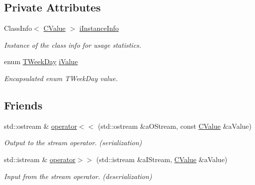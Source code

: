 \subsection*{Private Attributes}
\begin{DoxyCompactItemize}
\item 
Class\+Info$<$ \hyperlink{class_c_value___t_week_day_1_1_c_value}{C\+Value} $>$ \hyperlink{class_c_value___t_week_day_1_1_c_value_ad4482c30bcef137bae7669a2d7378cae}{i\+Instance\+Info}
\begin{DoxyCompactList}\small\item\em Instance of the class info for usage statistics. \end{DoxyCompactList}\item 
enum \hyperlink{namespace_c_value___t_week_day_a6412f204509f223b789fb5f1a61a6124}{T\+Week\+Day} \hyperlink{class_c_value___t_week_day_1_1_c_value_ad067d6e43b0204dc09f1177721891a75}{i\+Value}
\begin{DoxyCompactList}\small\item\em Encapsulated {\ttfamily enum} T\+Week\+Day value. \end{DoxyCompactList}\end{DoxyCompactItemize}
\subsection*{Friends}
\begin{DoxyCompactItemize}
\item 
std\+::ostream \& \hyperlink{class_c_value___t_week_day_1_1_c_value_a3d28097fae6bdd5a8146d9ab90f8b62f}{operator$<$$<$} (std\+::ostream \&a\+O\+Stream, const \hyperlink{class_c_value___t_week_day_1_1_c_value}{C\+Value} \&a\+Value)
\begin{DoxyCompactList}\small\item\em Output to the stream operator. ({\itshape serialization}) \end{DoxyCompactList}\item 
std\+::istream \& \hyperlink{class_c_value___t_week_day_1_1_c_value_aba05045ca890e398c1211784aebbc9ed}{operator$>$$>$} (std\+::istream \&a\+I\+Stream, \hyperlink{class_c_value___t_week_day_1_1_c_value}{C\+Value} \&a\+Value)
\begin{DoxyCompactList}\small\item\em Input from the stream operator. ({\itshape deserialization}) \end{DoxyCompactList}\end{DoxyCompactItemize}


